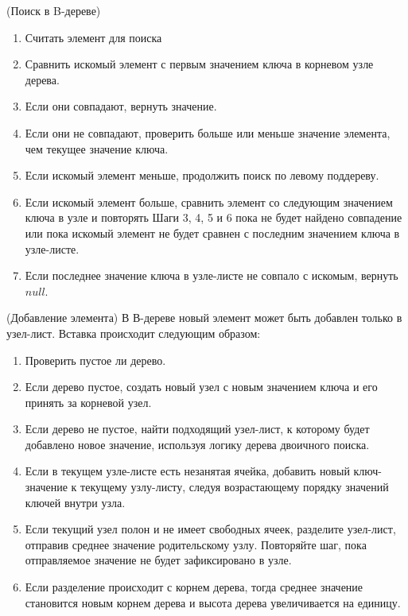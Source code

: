 \begin{algoritm}(Поиск в B-дереве)
    \begin{enumerate}
        \item Считать элемент для поиска
        \item Сравнить искомый элемент с первым значением ключа в корневом узле дерева.
        \item Если они совпадают, вернуть значение.
        \item Если они не совпадают, проверить больше или меньше значение элемента, чем текущее значение ключа.
        \item Если искомый элемент меньше, продолжить поиск по левому поддереву.
        \item Если искомый элемент больше, сравнить элемент со следующим значением ключа в узле и повторять Шаги 3, 4, 5 и 6 пока не будет найдено совпадение или пока искомый элемент не будет сравнен с последним значением ключа в узле-листе.
        \item Если последнее значение ключа в узле-листе не совпало с искомым, вернуть $null$.
    \end{enumerate}
\end{algoritm}


\begin{algoritm}(Добавление элемента)
    В В-дереве новый элемент может быть добавлен только в узел-лист. Вставка происходит следующим образом:
    \begin{enumerate}
        \item Проверить пустое ли дерево.
        \item Если дерево пустое, создать новый узел с новым значением ключа и его принять за корневой узел.
        \item Если дерево не пустое, найти подходящий узел-лист, к которому будет добавлено новое значение, используя логику дерева двоичного поиска.
        \item Если в текущем узле-листе есть незанятая ячейка, добавить новый ключ-значение к текущему узлу-листу, следуя возрастающему порядку значений ключей внутри узла.
        \item Если текущий узел полон и не имеет свободных ячеек, разделите узел-лист, отправив среднее значение родительскому узлу. Повторяйте шаг, пока отправляемое значение не будет зафиксировано в узле.
        \item Если разделение происходит с корнем дерева, тогда среднее значение становится новым корнем дерева и высота дерева увеличивается на единицу.
    \end{enumerate}
\end{algoritm}

